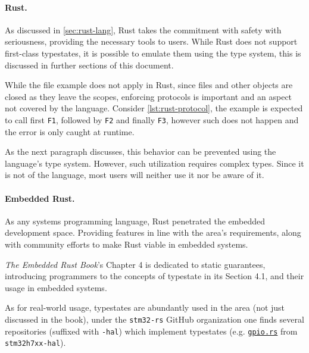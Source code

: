 






\paragraph{Rust.}
As discussed in \autoref{sec:rust-lang}, Rust takes the commitment with safety with seriousness,
providing the necessary tools to users. While Rust does not support first-class typestates,
it is possible to emulate them using the type system, this is discussed in further sections of this document.

While the file example does not apply in Rust, since files and other objects are closed as they leave the scopes,
enforcing protocols is important and an aspect not covered by the language.
Consider \autoref{lst:rust-protocol}, the example is expected to call first \texttt{F1}, followed by \texttt{F2} and finally \texttt{F3},
however such does not happen and the error is only caught at runtime.



As the next paragraph discusses, this behavior can be prevented using the language's type system.
However, such utilization requires complex types.
Since it is not  of the language, most users will neither use it nor be aware of it.

\paragraph{Embedded Rust.} As any systems programming language, Rust penetrated the embedded development space.
Providing features in line with the area's requirements, along with community efforts to make Rust viable in embedded systems.

\emph{The Embedded Rust Book}'s Chapter 4 is dedicated to static guarantees,
introducing programmers to the concepts of typestate in its Section 4.1,
and their usage in embedded systems.

As for real-world usage, typestates are abundantly used in the area (not just discussed in the book),
under the \texttt{stm32-rs} GitHub organization one finds several repositories (suffixed with \texttt{-hal})
which implement typestates
(e.g. \href{https://github.com/stm32-rs/stm32h7xx-hal/blob/master/src/gpio.rs#L51-L128}{\texttt{gpio.rs}}
from \texttt{stm32h7xx-hal}).

